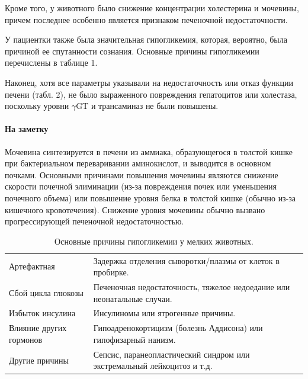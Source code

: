 \documentclass[a4paper,12pt]{book}
\begin{document}
Кроме того, у животного было снижение концентрации холестерина и мочевины, причем последнее особенно является признаком печеночной недостаточности.

У пациентки также была значительная гипогликемия, которая, вероятно, была причиной ее спутанности сознания. Основные причины гипогликемии перечислены в таблице 1.

Наконец, хотя все параметры указывали на недостаточность или отказ функции печени (табл. 2), не было выраженного повреждения гепатоцитов или холестаза, поскольку уровни $\gamma$GT и трансаминаз не были повышены.

\paragraph{На заметку}
Мочевина синтезируется в печени из аммиака, образующегося в толстой кишке при бактериальном переваривании аминокислот, и выводится в основном почками. Основными причинами повышения мочевины являются снижение скорости почечной элиминации (из-за повреждения почек или уменьшения почечного объема) или повышение уровня белка в толстой кишке (обычно из-за кишечного кровотечения). Снижение уровня мочевины обычно вызвано прогрессирующей печеночной недостаточностью.

\begin{table}[htbp]
\centering
\caption{Основные причины гипогликемии у мелких животных.}
\begin{tabular}{p{6cm}p{8cm}}
\toprule
Артефактная & Задержка отделения сыворотки/плазмы от клеток в пробирке. \\
Сбой цикла глюкозы & Печеночная недостаточность, тяжелое недоедание или неонатальные случаи. \\
Избыток инсулина & Инсулиномы или ятрогенные причины. \\
Влияние других гормонов & Гипоадренокортицизм (болезнь Аддисона) или гипофизарный нанизм. \\
Другие причины & Сепсис, паранеопластический синдром или экстремальный лейкоцитоз и т.д. \\
\bottomrule
\end{tabular}
\end{table}
\end{document}
